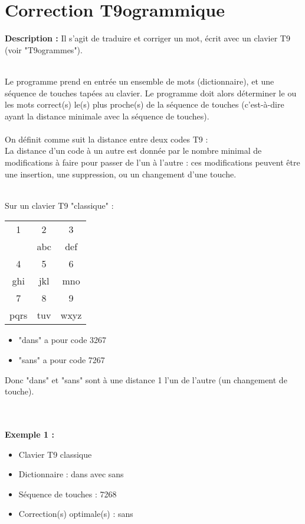 \documentclass[10pt]{article}
\begin{document}
\section*{Correction T9ogrammique}
\noindent
\textbf{Description :}  Il s'agit de traduire et corriger un mot, écrit avec un clavier T9 (voir "T9ogrammes").

~\\
Le programme prend en entrée un ensemble de mots (dictionnaire), et une séquence de touches tapées au clavier.
Le programme doit alors déterminer le ou les mots correct(s) le(s) plus proche(s) de la séquence de touches (c'est-à-dire ayant la distance minimale avec la séquence de touches).
~\\
~\\
On définit comme suit la distance entre deux codes T9 :\\
La distance d'un code à un autre est donnée par le nombre minimal de modifications à faire pour passer de l'un à l'autre : ces modifications peuvent être une insertion, une suppression, ou un changement d'une touche.

~\\
\noindent
Sur un clavier T9 "classique" :
\begin{center}
\begin{tabular}{|c|c|c|}
\hline
 1 & 2 & 3\\
 & abc & def\\
\hline
 4 & 5 & 6\\
 ghi & jkl & mno\\
\hline
 7 & 8 & 9\\
 pqrs & tuv & wxyz\\
\hline
\end{tabular}
\end{center}
\noindent
\begin{itemize}
\item "dans" a pour code 3267
\item "sans" a pour code 7267
\end{itemize}
Donc "dans" et "sans" sont à une distance 1 l'un de l'autre (un changement de touche).

~\\
~\\
\noindent
\textbf{Exemple 1 :}
\begin{itemize}
\item Clavier T9 classique
\item Dictionnaire : dans avec sans
\item Séquence de touches : 7268
\item Correction(s) optimale(s) : sans
\end{itemize}
\end{document}
